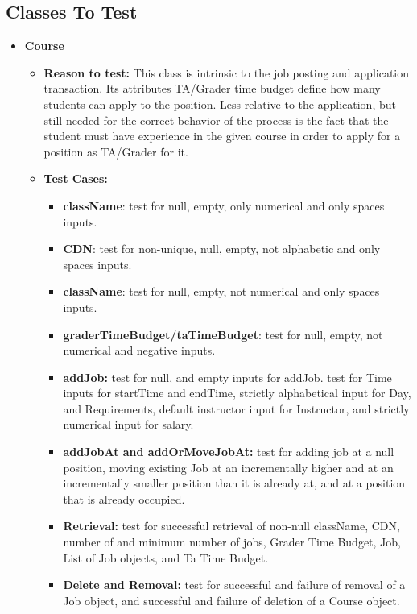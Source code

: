 \documentclass[12pt]{report}
\begin{document}
    \subsection{Classes To Test}
    \begin{itemize}
        \item \textbf{Course}
        \begin{itemize}
            \item \textbf{Reason to test:} This class is intrinsic to the job posting and application transaction. Its attributes TA/Grader time budget define how many students can apply to the position. Less relative to the application, but still needed for the correct behavior of the process is the fact that the student must have experience in the given course in order to apply for a position as TA/Grader for it.
            \item \textbf{Test Cases:} 
            \begin{itemize}
                \item \textbf{className}: test for null, empty, only numerical and only spaces inputs.
                \item \textbf{CDN}: test for non-unique, null, empty, not alphabetic and only spaces inputs.
                \item \textbf{className}: test for null, empty, not numerical and only spaces inputs.
                \item \textbf{graderTimeBudget/taTimeBudget}: test for null, empty, not numerical and negative inputs.
                \item \textbf{addJob:} test for null, and empty inputs for addJob. test for Time inputs for startTime and endTime, strictly alphabetical input for Day, and Requirements, default instructor input for Instructor, and strictly numerical input for salary.
                \item \textbf{addJobAt and addOrMoveJobAt:} test for adding job at a null position, moving existing Job at an incrementally higher and at an incrementally smaller position than it is already at, and at a position that is already occupied.
                \item \textbf{Retrieval:} test for successful retrieval of non-null className, CDN, number of and minimum number of jobs, Grader Time Budget, Job, List of Job objects, and Ta Time Budget.
                \item \textbf{Delete and Removal:} test for successful and failure of removal of a Job object, and successful and failure of deletion of a Course object.
            \end{itemize}
        \end{itemize}
        

\end{itemize}
\end{document}
